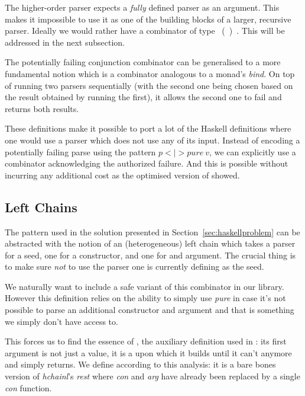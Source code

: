 
\label{parser:some} The higher-order parser 
expects a \emph{fully} defined parser as an argument. This makes
it impossible to use it as one of the building blocks of a larger,
recursive parser. Ideally we would rather have a combinator of
type \mbox{\AF{[}     ( ) \AF{]}}.
This will be addressed in the next subsection.
\medskip{}

The potentially failing conjunction combinator  can be
generalised to a more fundamental notion  which is a
combinator analogous to a monad's \textit{bind}. On top of running
two parsers sequentially (with the second one being chosen based on
the result obtained by running the first), it allows the second one to
fail and returns both results.


These definitions make it possible to port a lot of the Haskell
definitions where one would use a parser which does not use any of its
input. Instead of encoding a potentially failing parse using the pattern
$\textit{p} \mathbin{<\!\!|\!\!>} \textit{pure}~ v$, we can explicitly
use a combinator acknowledging the authorized failure. And this is possible
without incurring any additional cost as the optimised version of 
showed.

\subsection{Left Chains}\label{sec:leftchains}

The pattern used in the solution presented in Section~\ref{sec:haskellproblem}
can be abstracted with the notion of an (heterogeneous) left chain which takes
a parser for a seed, one for a constructor, and one for and argument. The crucial
thing is to make sure \emph{not} to use the parser one is currently defining as
the seed.


We naturally want to include a safe variant of this combinator in our
library. However this definition relies on the ability to simply use
\textit{pure} in case it's not possible to parse an additional
constructor and argument and that is something we simply don't have
access to.

This forces us to find the essence of , the auxiliary definition
used in : its first argument is not just a value, it is a
 upon which it builds until it can't anymore and simply returns.
We define  according to this analysis: it is a bare bones version
of \textit{hchainl}'s \textit{rest} where \textit{con} and \textit{arg} have
already been replaced by a single \textit{con} function.


